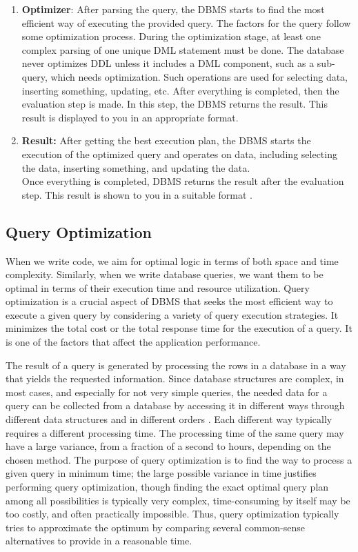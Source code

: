 \begin{enumerate}
    \item \textbf{Optimizer}: After parsing the query, the DBMS starts to find the most efficient way of executing the provided query. The factors for the query follow some optimization process. During the optimization stage, at least one complex parsing of one unique DML statement must be done. The database never optimizes DDL unless it includes a DML component, such as a sub-query, which needs optimization. Such operations are used for selecting data, inserting something, updating, etc. After everything is completed, then the evaluation step is made. In this step, the DBMS returns the result. This result is displayed to you in an appropriate format.
    \item \textbf{Result:} After getting the best execution plan, the DBMS starts the execution of the optimized query and operates on data, including selecting the data, inserting something, and updating the data.\\
    Once everything is completed, DBMS returns the result after the evaluation step. This result is shown to you in a suitable format \cite{Query,QueryProcessing,Oracle}.
\end{enumerate}

\subsection{Query Optimization }When we write code, we aim for optimal logic in terms of both space and time complexity. Similarly, when we write database queries, we want them to be optimal in terms of their execution time and resource utilization. Query optimization is a crucial aspect of DBMS that seeks the most efficient way to execute a given query by considering a variety of query execution strategies. It minimizes the total cost or the total response time for the execution of a query. It is one of the factors that affect the application performance.\vspace{.4cm}

The result of a query is generated by processing the rows in a database in a way that yields the requested information. Since database structures are complex, in most cases, and especially for not very simple queries, the needed data for a query can be collected from a database by accessing it in different ways through different data structures and in different orders \cite{selinger-1979}. Each different way typically requires a different processing time. The processing time of the same query may have a large variance, from a fraction of a second to hours, depending on the chosen method. The purpose of query optimization is to find the way to process a given query in minimum time; the large possible variance in time justifies performing query optimization, though finding the exact optimal query plan among all possibilities is typically very complex, time-consuming by itself may be too costly, and often practically impossible. Thus, query optimization typically tries to approximate the optimum by comparing several common-sense alternatives to provide in a reasonable time.\vspace{.4cm}


